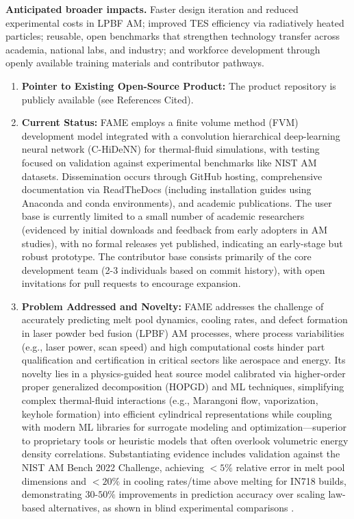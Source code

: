 \documentclass[11pt]{article}
\begin{document}
\noindent
\textbf{Anticipated broader impacts.} Faster design iteration and reduced experimental costs in LPBF AM; improved TES efficiency via radiatively heated particles; reusable, open benchmarks that strengthen technology transfer across academia, national labs, and industry; and workforce development through openly available training materials and contributor pathways.\vspace{-3pt}
\begin{enumerate}
    \item \textbf{Pointer to Existing Open-Source Product:} The product repository is publicly available (see References Cited).
    \vspace{-3pt}
    \item \textbf{Current Status:} FAME employs a finite volume method (FVM) development model integrated with a convolution hierarchical deep-learning neural network (C-HiDeNN) for thermal-fluid simulations, with testing focused on validation against experimental benchmarks like NIST AM datasets. Dissemination occurs through GitHub hosting, comprehensive documentation via ReadTheDocs (including installation guides using Anaconda and conda environments), and academic publications. The user base is currently limited to a small number of academic researchers (evidenced by initial downloads and feedback from early adopters in AM studies), with no formal releases yet published, indicating an early-stage but robust prototype. The contributor base consists primarily of the core development team (2-3 individuals based on commit history), with open invitations for pull requests to encourage expansion.
    \vspace{-3pt}
    \item \textbf{Problem Addressed and Novelty:} FAME addresses the challenge of accurately predicting melt pool dynamics, cooling rates, and defect formation in laser powder bed fusion (LPBF) AM processes, where process variabilities (e.g., laser power, scan speed) and high computational costs hinder part qualification and certification in critical sectors like aerospace and energy. Its novelty lies in a physics-guided heat source model calibrated via higher-order proper generalized decomposition (HOPGD) and ML techniques, simplifying complex thermal-fluid interactions (e.g., Marangoni flow, vaporization, keyhole formation) into efficient cylindrical representations while coupling with modern ML libraries for surrogate modeling and optimization—superior to proprietary tools or heuristic models that often overlook volumetric energy density correlations. Substantiating evidence includes validation against the NIST AM Bench 2022 Challenge, achieving $<5\%$ relative error in melt pool dimensions and $<20\%$ in cooling rates/time above melting for IN718 builds, demonstrating $30\text{-}50\%$ improvements in prediction accuracy over scaling law-based alternatives, as shown in blind experimental comparisons \cite{aminPhysicsGuidedHeat2024}.

\end{enumerate}
\end{document}

